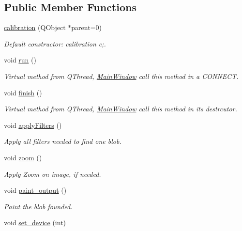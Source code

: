 \subsection*{Public Member Functions}
\begin{DoxyCompactItemize}
\item 
\hyperlink{classcalibration_ad32a2ff0e4e27bd28ac06d7dda8b5853}{calibration} (Q\-Object $\ast$parent=0)
\begin{DoxyCompactList}\small\item\em Default constructor\-: calibration c;. \end{DoxyCompactList}\item 
void \hyperlink{classcalibration_a4b435b278f024e919b733627884ba0d2}{run} ()
\begin{DoxyCompactList}\small\item\em Virtual method from Q\-Thread, \hyperlink{classMainWindow}{Main\-Window} call this method in a C\-O\-N\-N\-E\-C\-T. \end{DoxyCompactList}\item 
\hypertarget{classcalibration_a01c20860fb99a2370c191b0228e82af4}{void \hyperlink{classcalibration_a01c20860fb99a2370c191b0228e82af4}{finish} ()}\label{classcalibration_a01c20860fb99a2370c191b0228e82af4}

\begin{DoxyCompactList}\small\item\em Virtual method from Q\-Thread, \hyperlink{classMainWindow}{Main\-Window} call this method in its destrcutor. \end{DoxyCompactList}\item 
void \hyperlink{classcalibration_a17edbce9454069eaa50cc84aa1cb34fd}{apply\-Filters} ()
\begin{DoxyCompactList}\small\item\em Apply all filters needed to find one blob. \end{DoxyCompactList}\item 
void \hyperlink{classcalibration_af2cc271619bd9d5c0e72ebbbf1b83f39}{zoom} ()
\begin{DoxyCompactList}\small\item\em Apply Zoom on image, if needed. \end{DoxyCompactList}\item 
void \hyperlink{classcalibration_a9d29a622f2412fcf5cb654444d1bd43e}{paint\-\_\-output} ()
\begin{DoxyCompactList}\small\item\em Paint the blob founded. \end{DoxyCompactList}\item 
\hypertarget{classcalibration_adba399584f906544ce09309e5539bb84}{void \hyperlink{classcalibration_adba399584f906544ce09309e5539bb84}{set\-\_\-device} (int)}\label{classcalibration_adba399584f906544ce09309e5539bb84}


\end{DoxyCompactItemize}
